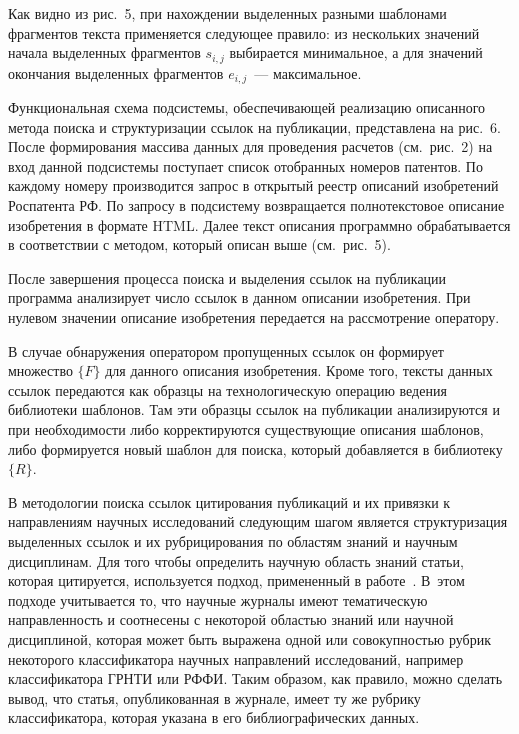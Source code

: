 \begin{multicols}{2}
      Как видно из рис.~5, при нахождении выделенных разными шаблонами фрагментов 
текста применяется следующее правило: из нескольких значений начала выделенных 
фрагментов $s_{i , j}$ выбирается минимальное, а для значений окончания выделенных 
фрагментов $e_{i , j}$~--- максимальное.
      
      Функциональная схема подсистемы, обеспечивающей реализацию описанного метода 
поиска и структуризации ссылок на публикации, пред\-став\-ле\-на на рис.~6. После формирования 
массива данных для проведения расчетов (см.\ рис.~2) на вход данной подсистемы поступает 
список отобранных номеров патентов. По каждому номеру производится запрос в открытый 
реестр описаний изобретений Роспатента РФ. По запросу в подсистему возвращается 
полнотекстовое описание изобретения в формате HTML. Далее текст описания программно 
обрабатывается в соответствии с методом, который описан выше (см.\ рис.~5).
      

      
      После завершения процесса поиска и выделения ссылок на публикации программа 
анализирует число ссылок в данном описании изобретения. При нулевом значении описание 
изобретения передается на рассмотрение оператору.
      
      В случае обнаружения оператором пропущенных ссылок он формирует множество 
$\{F\}$ для данного описания изобретения. Кроме того, тексты данных ссылок передаются как 
образцы на технологическую операцию ведения библиотеки шаб\-ло\-нов. Там эти образцы ссылок 
на публикации анализируются и при необходимости либо корректируются существующие 
описания шаблонов, либо формируется новый шаблон для поиска, который добавляется в 
библиотеку~$\{R\}$.
      
      В методологии поиска ссылок цитирования пуб\-ли\-ка\-ций и их привязки к направлениям 
научных исследований следующим шагом является структуризация выделенных ссылок и их 
рубрицирования по областям знаний и научным дисциплинам. Для того чтобы определить 
научную область знаний статьи, которая цитируется, используется подход, примененный в 
работе~\cite{20-zac}. В~этом подходе учитывается то, что научные журналы имеют 
тематическую направленность и соотнесены с некоторой областью знаний или научной 
дисциплиной, которая может быть выражена одной или со\-во\-куп\-ностью рубрик некоторого 
классификатора научных направлений исследований, например классификатора ГРНТИ или 
РФФИ. Таким образом, как правило, можно сделать вывод, что статья, опубликованная в 
журнале, имеет ту же рубрику классификатора, которая указана в его библиографических 
данных.
      

\end{multicols}
